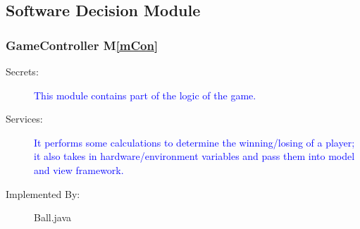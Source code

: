 \documentclass[12pt,letterpaper]{article}
\begin{document}
	\subsection{Software Decision Module}

	\subsubsection{GameController M\ref{mCon}}
\begin{description} 
	\item[Secrets: ] \textcolor{blue}{This module contains part of the logic of the game.}
	\item[Services: ] \textcolor{blue} {It performs some calculations to determine the winning/losing of a player; it also takes in hardware/environment variables and pass them into model and view framework.}
	\item[Implemented By: ] Ball.java
\end{description}
\end{document}
